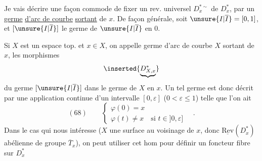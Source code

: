 Je vais décrire une façon commode de fixer un rev. universel $D_x^{*\sim}$ de $D_x^*$, par un \uline{germe} \uline{d'arc de courbe}  \uline{sortant}
de $x$. De façon générale, soit $\unsure{I|\overline I}=[0,1]$, et $[\unsure{I|\overline I}]$ le germe  de $\unsure{I|\overline I}$ en $0$.  


Si $X$ est un espace top. et $x\in X$, on appelle germe d'arc de courbe  $X$ sortant de $x$, les morphismes
\[
\inserted{\underbrace{D_{X,x}^*}}
\]
du germe $[\unsure{I|\overline I}]$ dans le germe  de $X$ en $x$. Un tel germe est donc décrit par une application continue d'un intervalle $[0,\varepsilon]$ ($0<\varepsilon\leq1$)
telle que l'on ait
\[
(68)\qquad\left\{\begin{array}{l}
\varphi(0)=x\\
\varphi(t)\neq x\quad\text{si }t\in]0,\varepsilon]
\end{array}\right.\quad.
\]
Dans le cas qui nous intéresse ($X$ une surface au voisinage de $x$, donc $\underline{\mathrm{Rev}}(D_x^*)$   abélienne de groupe $\overline T_x$), on peut utiliser cet hom pour définir un foncteur fibre sur $D_x^*$

